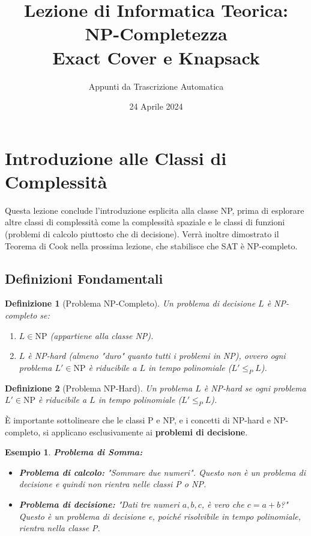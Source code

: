 \documentclass[a4paper]{article}
\title{Lezione di Informatica Teorica: NP-Completezza \\ Exact Cover e Knapsack}
\author{Appunti da Trascrizione Automatica}
\date{24 Aprile 2024}
\newtheorem{definition}{Definizione}
\newtheorem{example}{Esempio}
\begin{document}
\maketitle
\tableofcontents
\newpage

\section{Introduzione alle Classi di Complessità}

Questa lezione conclude l'introduzione esplicita alla classe NP, prima di esplorare altre classi di complessità come la complessità spaziale e le classi di funzioni (problemi di calcolo piuttosto che di decisione). Verrà inoltre dimostrato il Teorema di Cook nella prossima lezione, che stabilisce che SAT è NP-completo.

\subsection{Definizioni Fondamentali}

\begin{definition}[Problema NP-Completo]
Un problema di decisione $L$ è NP-completo se:
\begin{enumerate}
    \item $L \in \text{NP}$ (appartiene alla classe NP).
    \item $L$ è NP-hard (almeno "duro" quanto tutti i problemi in NP), ovvero ogni problema $L' \in \text{NP}$ è riducibile a $L$ in tempo polinomiale ($L' \le_P L$).
\end{enumerate}
\end{definition}

\begin{definition}[Problema NP-Hard]
Un problema $L$ è NP-hard se ogni problema $L' \in \text{NP}$ è riducibile a $L$ in tempo polinomiale ($L' \le_P L$).
\end{definition}

È importante sottolineare che le classi P e NP, e i concetti di NP-hard e NP-completo, si applicano esclusivamente ai \textbf{problemi di decisione}.

\begin{example}
\textbf{Problema di Somma:}
\begin{itemize}
    \item \textbf{Problema di calcolo:} "Sommare due numeri". Questo non è un problema di decisione e quindi non rientra nelle classi P o NP.
    \item \textbf{Problema di decisione:} "Dati tre numeri $a, b, c$, è vero che $c = a+b$?" Questo è un problema di decisione e, poiché risolvibile in tempo polinomiale, rientra nella classe P.
\end{itemize}
\end{example}
\end{document}
